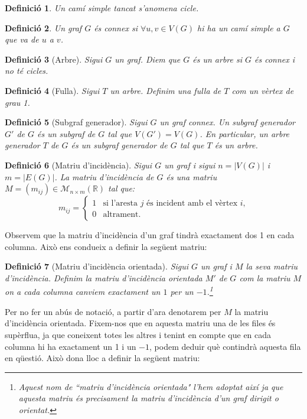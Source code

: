\documentclass{article}
\newtheorem{definition}{Definició}[section]
\begin{document}
\begin{definition}
    Un camí simple tancat s'anomena \textit{cicle}.
\end{definition}
\begin{definition}
    Un graf $G$ és \textit{connex} si $\forall u,v\in V(G)$ hi ha un camí simple a $G$ que va de $u$ a $v$.
\end{definition}
\begin{definition}[Arbre]
    Sigui $G$ un graf. Diem que $G$ és un arbre si $G$ és connex i no té cicles.
\end{definition}
\begin{definition}[Fulla]
    Sigui $T$ un arbre. Definim una fulla de $T$ com un vèrtex de grau 1.
\end{definition}
\begin{definition}[Subgraf generador]
    Sigui $G$ un graf connex. Un subgraf generador $G'$ de $G$ és un subgraf de $G$ tal que $V(G')=V(G)$. En particular, un arbre generador $T$ de $G$ és un subgraf generador de $G$ tal que $T$ és un arbre.
\end{definition}
\begin{definition}[Matriu d'incidència]
    Sigui $G$ un graf i sigui $n=|V(G)|$ i $m=|E(G)|$. La matriu d'incidència de $G$ és una matriu $M=(m_{ij})\in\mathcal{M}_{n\times m}(\mathbb{R})$ tal que:
    $$m_{ij}=\left\{\begin{array}{ll}
            1 & \text{si l'aresta $j$ és incident amb el vèrtex $i$,} \\
            0 & \text{altrament.}
        \end{array}\right.$$
\end{definition}
Observem que la matriu d'incidència d'un graf tindrà exactament dos 1 en cada columna. Això ens condueix a definir la següent matriu:
\begin{definition}[Matriu d'incidència orientada]
    Sigui $G$ un graf i $M$ la seva matriu d'incidència. Definim la matriu d'incidència orientada $M'$ de $G$ com la matriu $M$ on a cada columna canviem exactament un $1$ per un $-1$.\footnote{Aquest nom de ``matriu d'incidència orientada" l'hem adoptat així ja que aquesta matriu és precisament la matriu d'incidència d'un graf dirigit o orientat.} \cite{10}
\end{definition}
Per no fer un abús de notació, a partir d'ara denotarem per $M$ la matriu d'incidència orientada. Fixem-nos que en aquesta matriu una de les files és supèrflua, ja que coneixent totes les altres i tenint en compte que en cada columna hi ha exactament un 1 i un $-1$, podem deduir què contindrà aquesta fila en qüestió. Això dona lloc a definir la següent matriu:
\end{document}

